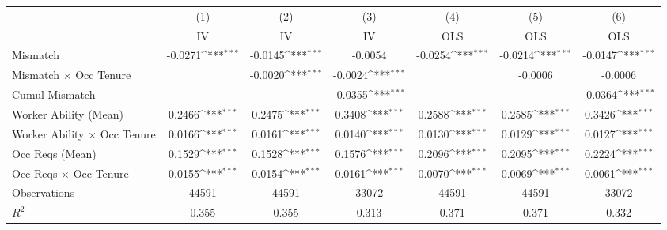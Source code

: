 {
\def\sym#1{\ifmmode^{#1}\else\(^{#1}\)\fi}
\begin{tabular}{l*{6}{c}}
\hline  
                    &\multicolumn{1}{c}{(1)}&\multicolumn{1}{c}{(2)}&\multicolumn{1}{c}{(3)}&\multicolumn{1}{c}{(4)}&\multicolumn{1}{c}{(5)}&\multicolumn{1}{c}{(6)}\\
                    &\multicolumn{1}{c}{IV}&\multicolumn{1}{c}{IV}&\multicolumn{1}{c}{IV}&\multicolumn{1}{c}{OLS}&\multicolumn{1}{c}{OLS}&\multicolumn{1}{c}{OLS}\\
\hline  
Mismatch            &     -0.0271\sym{***}&     -0.0145\sym{***}&     -0.0054         &     -0.0254\sym{***}&     -0.0214\sym{***}&     -0.0147\sym{***}\\
[1em]
Mismatch $\times$ Occ Tenure&                     &     -0.0020\sym{***}&     -0.0024\sym{***}&                     &     -0.0006         &     -0.0006         \\
[1em]
Cumul Mismatch      &                     &                     &     -0.0355\sym{***}&                     &                     &     -0.0364\sym{***}\\
[1em]
Worker Ability (Mean)&      0.2466\sym{***}&      0.2475\sym{***}&      0.3408\sym{***}&      0.2588\sym{***}&      0.2585\sym{***}&      0.3426\sym{***}\\
[1em]
Worker Ability $\times$ Occ Tenure&      0.0166\sym{***}&      0.0161\sym{***}&      0.0140\sym{***}&      0.0130\sym{***}&      0.0129\sym{***}&      0.0127\sym{***}\\
[1em]
Occ Reqs (Mean)     &      0.1529\sym{***}&      0.1528\sym{***}&      0.1576\sym{***}&      0.2096\sym{***}&      0.2095\sym{***}&      0.2224\sym{***}\\
[1em]
Occ Reqs $\times$ Occ Tenure&      0.0155\sym{***}&      0.0154\sym{***}&      0.0161\sym{***}&      0.0070\sym{***}&      0.0069\sym{***}&      0.0061\sym{***}\\
\hline  
Observations        &       44591         &       44591         &       33072         &       44591         &       44591         &       33072         \\
\(R^{2}\)           &       0.355         &       0.355         &       0.313         &       0.371         &       0.371         &       0.332         \\
\hline  
\end{tabular}
}
